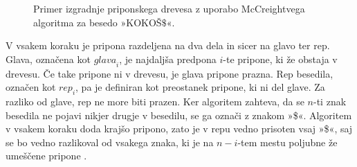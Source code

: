 \begin{figure}[htb]
    \begin{subfigure}[t]{0.3\linewidth}
        \subcaption*{}
        
        \centering
        \label{fig:McCreigov1}
    \end{subfigure}
    \hspace{0.5cm}
    \begin{subfigure}[t]{0.3\linewidth}
        \subcaption*{}
        
        \centering
        \label{fig:McCreigov2}
    \end{subfigure}
    \hspace{0.5cm}
    \begin{subfigure}[t]{0.3\linewidth}
        \subcaption*{}
        
        \centering
        \label{fig:McCreigov3}
    \end{subfigure}
    
    \begin{subfigure}[t]{0.3\linewidth}
        \subcaption*{}
        
        \centering
        \label{fig:McCreigov4}
    \end{subfigure}
    \hspace{0.5cm}
    \begin{subfigure}[t]{0.3\linewidth}
        \subcaption*{}
        
        \centering
        \label{fig:McCreigov5}
    \end{subfigure}
    \hspace{0.5cm}
    \begin{subfigure}[t]{0.3\textwidth}
        \subcaption*{}
        
        \centering
        \label{fig:McCreigov6}
    \end{subfigure}
        \caption{Primer izgradnje priponskega drevesa z uporabo McCreightvega algoritma za besedo »KOKOŠ$\$$«.} 
        \label{fig:McCreight}
\end{figure}

V vsakem koraku je pripona razdeljena na dva dela in sicer na glavo ter rep. Glava, označena kot $\textit{glava}_i$, je najdaljša predpona $i$-te pripone, ki že obstaja v drevesu. Če take pripone ni v drevesu, je glava pripone prazna. Rep besedila, označen kot $\textit{rep}_i$, pa je definiran kot preostanek pripone, ki ni del glave. Za razliko od glave, rep ne more biti prazen. Ker algoritem zahteva, da se $n$-ti znak besedila ne pojavi nikjer drugje v besedilu, se ga označi z znakom »\$«. Algoritem v vsakem koraku doda krajšo pripono, zato je v repu vedno prisoten vsaj »\$«, saj se bo vedno razlikoval od vsakega znaka, ki je na $n-i$-tem mestu poljubne že umeščene pripone \cite{McCreight1976}.

